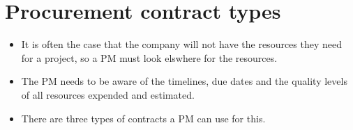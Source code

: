 \section{Procurement contract types}
\begin{itemize}
    \item It is often the case that the company will not have the resources they need for a project, so a PM must look elswhere for the resources. 
    \item The PM needs to be aware of the timelines, due dates and the quality levels of all resources expended and estimated.
    \item There are three types of contracts a PM can use for this.
\end{itemize}

